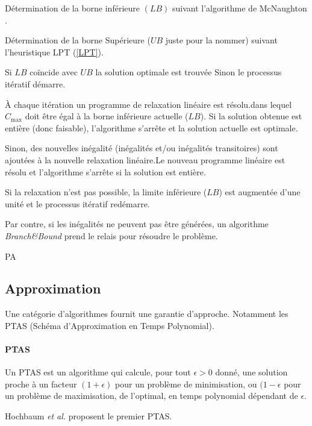 \documentclass[a4paper,12pt]{report}
\theoremstyle{plain}				%
\theoremstyle{definition}				%
\begin{document}
\bigskip
\begin{algorithm}[H]
\DontPrintSemicolon

Détermination de la borne inférieure $(LB)$ suivant l'algorithme de McNaughton \cite{mcnaughton1959scheduling}.

\BlankLine %
Détermination de la borne Supérieure ($UB$ juste pour la nommer) suivant l'heuristique LPT (\ref{LPT}).

\BlankLine %
Si $LB$ coïncide avec $UB$ la solution optimale est trouvée Sinon le processus itératif démarre.

\BlankLine
À chaque itération un programme de relaxation linéaire est résolu.dans lequel $C_{\max}$ doit être égal à la borne inférieure actuelle ($LB$). Si la solution obtenue est entière (donc faisable), l'algorithme s'arrête et la solution actuelle est optimale.

\BlankLine
Sinon, des nouvelles inégalité (inégalités et/ou inégalités transitoires) sont ajoutées à la nouvelle relaxation linéaire.Le nouveau programme linéaire est résolu et l'algorithme s'arrête si la solution est entière.

\BlankLine
Si la relaxation n'est pas possible, la limite inférieure ($LB$) est augmentée d'une unité et le processus itératif redémarre.

\BlankLine
Par contre, si les inégalités ne peuvent pas être générées, un algorithme \textit{Branch\&Bound} prend le relais pour résoudre le problème.

\caption{PA\label{PA}}
\end{algorithm}


\subsection{Approximation}
Une catégorie d'algorithmes fournit une garantie d'approche. Notamment les PTAS (Schéma d'Approximation en Temps Polynomial).

\paragraph{PTAS}

Un PTAS est un algorithme qui calcule, pour tout $\epsilon > 0$ donné, une solution proche à un facteur $(1+\epsilon)$ pour un problème de minimisation, ou $(1-\epsilon$ pour un problème de maximisation, de l'optimal, en temps polynomial dépendant de $\epsilon$.

\bigskip
Hochbaum \textit{et al.} \cite{hochbaum1987using} proposent le premier PTAS.
\end{document}
